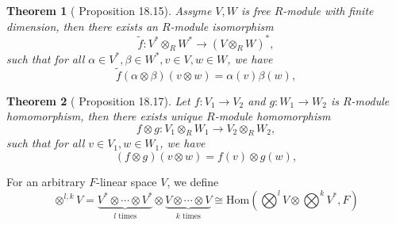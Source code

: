 \documentclass[12pt,a4paper,draft]{article}  %
\newcounter{cite}
\newtheorem{theorem}{Theorem}[section]
\theoremstyle{definition}
\numberwithin{equation}{section}
\begin{document}
\begin{theorem}[\cite{Tu2017} Proposition 18.15]\label{dual_tensor_product}
        Assyme $V,W$ is free $R$-module with finite dimension, then there exists an $R$-module isomorphism
    \[
    \tilde{f}:V^\ast \otimes_R W^\ast \to (V\otimes_R W)^\ast,
    \]
    such that for all $\alpha \in V^*, \beta \in W^*, v\in V, w\in W$, we have
    \[
    \tilde{f}(\alpha \otimes \beta)(v\otimes w) = \alpha(v) \beta(w),
    \]
\end{theorem}
\begin{theorem}[\cite{Tu2017} Proposition 18.17]\label{tensor_product_homomorphism}
        Let $f:V_1 \to V_2$ and $g:W_1 \to W_2$ is $R$-module homomorphism, then there exists unique $R$-module homomorphism
    \[
    f\otimes g: V_1 \otimes_R W_1 \to V_2 \otimes_R W_2,
    \]
        such that for all $v\in V_1, w\in W_1$, we have
    \[
    (f\otimes g)(v\otimes w) = f(v) \otimes g(w),
    \]
\end{theorem}

For an arbitrary $F$-linear space $V$, we define
\begin{equation}
        \otimes^{l,k} V = \underbrace{V^\ast \otimes \cdots \otimes V^\ast}_{l\text{ times}} \otimes \underbrace{V \otimes \cdots \otimes V}_{k\text{ times}} \cong \mathrm{Hom}\left(\bigotimes^l V\otimes\bigotimes^k V^\ast,F\right)
\end{equation}
\end{document}
